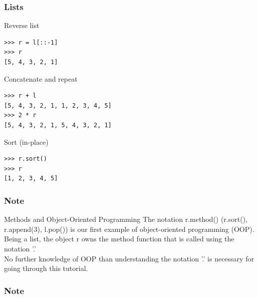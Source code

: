 \documentclass[colorlinks]{beamer}
\begin{document}
\begin{frame}[fragile]\frametitle{Lists}
\vspace{-0.2cm}
\begin{block}{Reverse list}
\tiny
\begin{verbatim}
>>> r = l[::-1]
>>> r
[5, 4, 3, 2, 1]
\end{verbatim}

\end{block}
\vspace{-0.2cm}
\begin{block}{Concatenate and repeat}
\tiny
\begin{verbatim}
>>> r + l
[5, 4, 3, 2, 1, 1, 2, 3, 4, 5]
>>> 2 * r
[5, 4, 3, 2, 1, 5, 4, 3, 2, 1]
\end{verbatim}


\end{block}
\vspace{-0.2cm}
\begin{block}{Sort (in-place)}
\tiny
\begin{verbatim}
>>> r.sort()
>>> r
[1, 2, 3, 4, 5]
\end{verbatim}

\end{block}
\end{frame}
\begin{frame}[fragile]\frametitle{Note}
\begin{block}{Methods and Object-Oriented Programming}
The notation r.method() (r.sort(), r.append(3), l.pop()) is our first example of object-oriented programming (OOP). Being a list, the object r owns the method function that is called using the notation '.'\\ No further knowledge of OOP than understanding the notation '.' is necessary for going through this tutorial.
\end{block}
\end{frame}
\begin{frame}[fragile]\frametitle{Note}
\end{frame}
\end{document}
